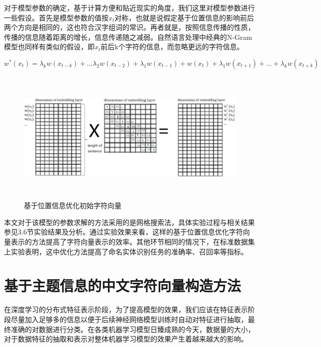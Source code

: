 \documentclass[winfonts,master,oneside,nobackinfo]{njuthesis}
\begin{document}
对于模型参数的确定，基于计算方便和贴近现实的角度，我们这里对模型参数进行一些假设。首先是模型参数的值按$x_{t}$对称，也就是说假定基于位置信息的影响前后两个方向是相同的，这也符合汉字组词的常识。再者就是，按照信息传播的性质，传播的信息随着距离的增长，信息传递随之减弱。自然语言处理中经典的N-Gram模型也同样有类似的假设，即$x_{t}$前后k个字符的信息，而忽略更远的字符信息。

\begin{equation}
w^{*}\left(x_{t}\right)=\lambda_{k} w\left(x_{t-k}\right)+\ldots \lambda_{2}w\left(x_{t-2}\right)+\lambda_{1} w\left(x_{t-1}\right)+ w\left(x_{t}\right)+\lambda_{1} w\left(x_{t+1}\right)+\ldots+\lambda_{k} w\left(x_{t+k}\right)
\end{equation}

\begin{figure}[H]
\centering
\begin{minipage}[t]{\textwidth}
\includegraphics[width=1.04\textwidth,height=6.5cm]{./figure/基于位置信息变化.jpg}
\caption{基于位置信息优化初始字符向量}
\label{lab:1}
\end{minipage}
\end{figure}

本文对于该模型的参数求解的方法采用的是网格搜索法，具体实验过程与相关结果参见3.6节实验结果及分析。通过实验效果来看，这样的基于位置信息优化字符向量表示的方法提高了字符向量表示的效率。其他环节相同的情况下，在标准数据集上实验表明，这中优化方法提高了命名实体识别任务的准确率、召回率等指标。

\section{基于主题信息的中文字符向量构造方法}

在深度学习的分布式特征表示阶段，为了提高模型的效果，我们应该在特征表示阶段尽量加入足够多的信息以便于后续神经网络模型训练时自动对特征进行抽取，最终准确的对数据进行分类。在各类机器学习模型日臻成熟的今天，数据量的大小，对于数据特征的抽取和表示对整体机器学习模型的效果产生着越来越大的影响。
\end{document}
